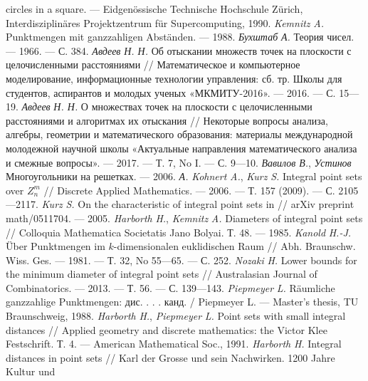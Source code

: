 \begin{thebibliography}{99}
circles in a square. — Eidgenössische Technische Hochschule
Zürich, Interdisziplinäres Projektzentrum für Supercomputing,
1990.
\textsl{Kemnitz} \textsl{A.} Punktmengen mit ganzzahligen
Abständen. — 1988.
\textsl{Бухштаб} \textsl{А.} Теория чисел. — 1966. — С. 384.
\textsl{Авдеев} \textsl{Н. Н.} Об отыскании множеств точек на
плоскости с целочисленными расстояниями /\!/ Математическое
и компьютерное моделирование, информационные технологии
управления: сб. тр. Школы для студентов, аспирантов и
молодых ученых «МКМИТУ-2016». — 2016. — С. 15—19.
\textsl{Авдеев} \textsl{Н. Н.} О множествах точек на
плоскости с целочисленными расстояниями и алгоритмах их
отыскания /\!/ Некоторые вопросы анализа, алгебры, геометрии
и математического образования: материалы международной
молодежной научной школы «Актуальные направления
математического анализа и смежные вопросы». — 2017. — Т. 7,
No I. — С. 9—10.
\textsl{Вавилов} \textsl{В.}, \textsl{Устинов}
Многоугольники на решетках. — 2006.
\textsl{А.}
\textsl{Kohnert} \textsl{A.}, \textsl{Kurz} \textsl{S.} Integral
point sets over $Z^m_n$
/\!/ Discrete Applied Mathematics. — 2006. —
Т. 157 (2009). — С. 2105—2117.
\textsl{Kurz} \textsl{S.} On the characteristic of integral point
sets in /\!/ arXiv preprint math/0511704. — 2005.
\textsl{Harborth} \textsl{H.}, \textsl{Kemnitz} \textsl{A.}
Diameters of integral point sets /\!/ Colloquia Mathematica
Societatis Jano Bolyai. Т. 48. — 1985.
\textsl{Kanold}
\textsl{H.-J.}
Über
Punktmengen
im
$k$-dimensionalen euklidischen Raum /\!/ Abh. Braunschw. Wiss.
Ges. — 1981. — Т. 32, No 55—65. — С. 252.
\textsl{Nozaki} \textsl{H.} Lower bounds for the minimum
diameter of integral point sets /\!/ Australasian Journal of
Combinatorics. — 2013. — Т. 56. — С. 139—143.
\textsl{Piepmeyer}
\textsl{L.}
Räumliche
ganzzahlige
Punktmengen: дис. . . . канд. / Piepmeyer L. — Master’s
thesis, TU Braunschweig, 1988.
\textsl{Harborth} \textsl{H.}, \textsl{Piepmeyer} \textsl{L.}
Point sets with small integral distances /\!/ Applied geometry and
discrete mathematics: the Victor Klee Festschrift. Т. 4. — American
Mathematical Soc., 1991.
\textsl{Harborth} \textsl{H.} Integral distances in point sets /\!/
Karl der Grosse und sein Nachwirken. 1200 Jahre Kultur und

\end{thebibliography}
